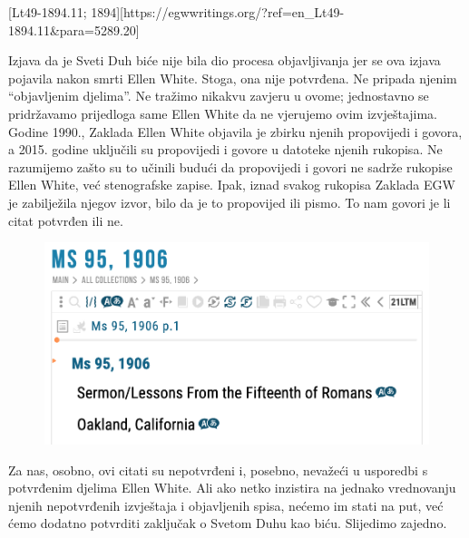 [Lt49-1894.11; 1894][https://egwwritings.org/?ref=en\_Lt49-1894.11&para=5289.20]

Izjava da je Sveti Duh biće nije bila dio procesa objavljivanja jer se ova izjava pojavila nakon smrti Ellen White. Stoga, ona nije potvrđena. Ne pripada njenim “objavljenim djelima”. Ne tražimo nikakvu zavjeru u ovome; jednostavno se pridržavamo prijedloga same Ellen White da ne vjerujemo ovim izvještajima. Godine 1990., Zaklada Ellen White objavila je zbirku njenih propovijedi i govora, a 2015. godine uključili su propovijedi i govore u datoteke njenih rukopisa. Ne razumijemo zašto su to učinili budući da propovijedi i govori ne sadrže rukopise Ellen White, već stenografske zapise. Ipak, iznad svakog rukopisa Zaklada EGW je zabilježila njegov izvor, bilo da je to propovijed ili pismo. To nam govori je li citat potvrđen ili ne.

\begin{figure}
    \centering
    \includegraphics[width=1\linewidth]{images/sermons-and-talks.png}
    \label{fig:enter-label}
\end{figure}

Za nas, osobno, ovi citati su nepotvrđeni i, posebno, nevažeći u usporedbi s potvrđenim djelima Ellen White. Ali ako netko inzistira na jednako vrednovanju njenih nepotvrđenih izvještaja i objavljenih spisa, nećemo im stati na put, već ćemo dodatno potvrditi zaključak o Svetom Duhu kao biću. Slijedimo zajedno.


